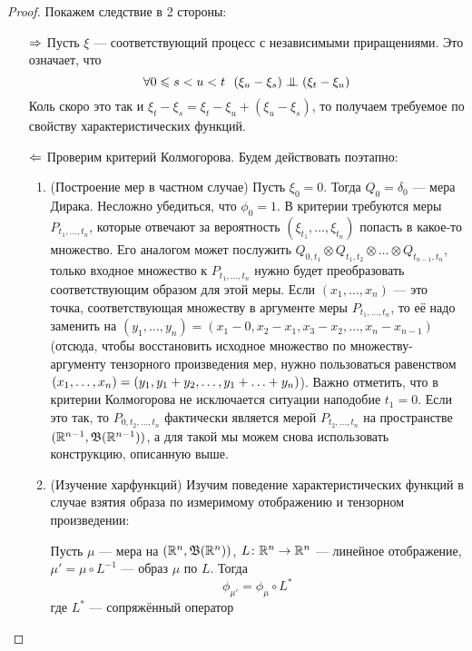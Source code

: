 \begin{proof}
	Покажем следствие в 2 стороны:
	\begin{itemize}
		\item[$\Rightarrow$] Пусть $\xi$ --- соответствующий процесс с независимыми приращениями. Это означает, что
		\[
			\forall 0 \leqslant s < u < t\ \ (\xi_u - \xi_s) \perp\mkern-9.5mu\perp (\xi_t - \xi_u)
		\]
		Коль скоро это так и $\xi_t - \xi_s = \xi_t - \xi_u + (\xi_u - \xi_s)$, то получаем требуемое по свойству характеристических функций.
		
		\item[$\Leftarrow$] Проверим критерий Колмогорова. Будем действовать поэтапно:
		\begin{enumerate}
			\item (Построение мер в частном случае) Пусть $\xi_0 = 0$. Тогда $Q_0 = \delta_0$ --- мера Дирака. Несложно убедиться, что $\phi_0 = 1$. В критерии требуются меры $P_{t_1, \ldots, t_n}$, которые отвечают за вероятность $(\xi_{t_1}, \ldots, \xi_{t_n})$ попасть в какое-то множество. Его аналогом может послужить $Q_{0, t_1} \otimes Q_{t_1, t_2} \otimes \ldots \otimes Q_{t_{n - 1}, t_n}$, только входное множество к $P_{t_1, \ldots, t_n}$ нужно будет преобразовать соответствующим образом для этой меры. Если $(x_1, \ldots, x_n)$ --- это точка, соответствующая множеству в аргументе меры $P_{t_1, \ldots, t_n}$, то её надо заменить на $(y_1, \ldots, y_n) = (x_1 - 0, x_2 - x_1, x_3 - x_2, \ldots, x_n - x_{n - 1})$ (отсюда, чтобы восстановить исходное множество по множеству-аргументу тензорного произведения мер, нужно пользоваться равенством $(x_1, \ldots, x_n) = (y_1, y_1 + y_2, \ldots, y_1 + \ldots + y_n)$). Важно отметить, что в критерии Колмогорова не исключается ситуации наподобие $t_1 = 0$. Если это так, то $P_{0, t_2, \ldots, t_n}$ фактически является мерой $P_{t_2, \ldots, t_n}$ на пространстве $(\mathbb{R}^{n - 1}, \mathfrak{B}(\mathbb{R}^{n - 1}))$, а для такой мы можем снова использовать конструкцию, описанную выше.
			
			\item (Изучение харфункций) Изучим поведение характеристических функций в случае взятия образа по измеримому отображению и тензорном произведении:
			\begin{lemma}
				Пусть $\mu$ --- мера на $(\mathbb{R}^n, \mathfrak{B}(\mathbb{R}^n))$, $L \colon \mathbb{R}^n \to \mathbb{R}^n$ --- линейное отображение, $\mu' = \mu \circ L^{-1}$ --- образ $\mu$ по $L$. Тогда
				\[
					\phi_{\mu'} = \phi_\mu \circ L^*
				\]
				где $L^*$ --- сопряжённый оператор
			\end{lemma}
			

\end{enumerate}
\end{itemize}
\end{proof}

